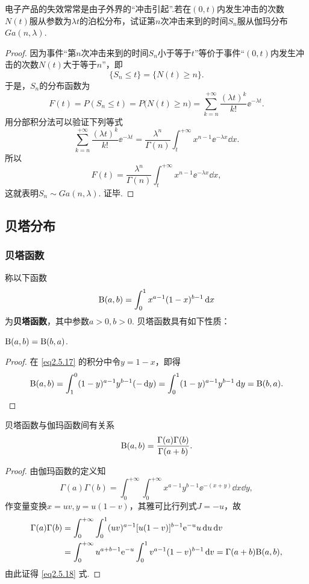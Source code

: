 \begin{example}
  电子产品的失效常常是由子外界的“冲击引起”.若在$(0,t)$内发生冲击的次数$N(t)$服从参数为$\lambda t$的泊松分布，试证第$n$次冲击来到的时间$S_n$服从伽玛分布$Ga(n,\lambda)$.
\end{example}
\begin{proof}
  因为事件“第$n$次冲击来到的时间$S_n$小于等于$t$”等价于事件“$(0,t)$内发生冲击的次数$N(t)$大于等于$n$”，即
  \[
    \{ S_n \le t \} = \{ N(t) \ge n \}.
  \]
  于是，$S_n$的分布函数为
  \[
    F(t) = P(S_n \le t) = P\big( N(t) \ge n \big)
    = \sum_{k=n}^{+\infty}\frac{(\lambda t)^k}{k!}\ee^{-\lambda t}.
  \]
  用分部积分法可以验证下列等式
  \begin{equation}\label{eq2,5,16}
    \sum_{k=n}^{+\infty}\frac{(\lambda t)^k}{k!}\ee^{-\lambda t} = \frac{\lambda^n}{\Gamma(n)} \int_t^{+\infty}x^{n-1}\ee^{-\lambda x}\dd x.
  \end{equation}
  所以
  \[
    F(t) = \frac{\lambda^n}{\Gamma(n)} \int_t^{+\infty}x^{n-1}\ee^{-\lambda x}\dd x,
  \]
  这就表明$S_n\sim Ga(n,\lambda)$. 证毕.
\end{proof}

\subsection{贝塔分布}
\subsubsection{贝塔函数}
称以下函数
\begin{equation}\label{eq2.5.17}
  \mathrm B(a,b) = \int_0^1 x^{a-1}(1-x)^{b-1}\mathop{}\!\mathrm d x
\end{equation}
为\textbf{贝塔函数}，其中参数$a>0,b>0$. 贝塔函数具有如下性质：

\begin{inparaenum}[(1)]
  \item $\mathrm B(a,b)=\mathrm B(b,a)$.

  \begin{proof}
    在 \eqref{eq2.5.17} 的积分中令$y=1-x$，即得
    \[
      \mathrm B(a,b) = \int_1^0(1-y)^{a-1}y^{b-1}(-\mathop{}\!\mathrm d y) = \int_0^1 (1-y)^{a-1}y^{b-1}\mathop{}\!\mathrm d y = \mathrm B(b,a).
    \]
  \end{proof}

  \item 贝塔函数与伽玛函数间有关系
  \begin{equation}\label{eq2.5.18}
    \mathrm B(a,b) = \frac{\Gamma(a)\Gamma(b)}{\Gamma(a+b)}.
  \end{equation}
  \begin{proof}
    由伽玛函数的定义知
    \[
      \Gamma(a) \Gamma(b) = \int_0^{+\infty}\int_0^{+\infty}x^{a-1}y^{b-1}
      \ee^{-(x+y)} \dd x \dd y ,
    \]
    作变量变换$x=uv,y=u(1-v)$，其雅可比行列式$J=-u$，故
    \begin{align*}
      \Gamma(a)\Gamma(b) & = \int_0^{+\infty}\int_0^1(uv)^{a-1}[u(1-v)]^{b-1}
      \mathrm e^{-u}u \mathop{}\!\mathrm d u \mathop{}\!\mathrm d v \\
      & = \int_0^{+\infty}u^{a+b-1}\mathrm e^{-u} \int_0^1v^{a-1}(1-v)^{b-1}\mathop{}\!\mathrm d v
      = \Gamma(a+b)\mathrm B(a,b),
    \end{align*}
    由此证得 \eqref{eq2.5.18} 式.
  \end{proof}
\end{inparaenum}

